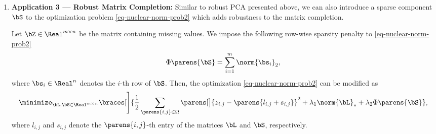 \documentclass[12pt]{article}
\begin{document}
\begin{enumerate}[label=\textbf{\arabic*.}]
\begin{enumerate}
	\end{enumerate}
		
	\item \textbf{Application 3 --- Robust Matrix Completion:} Similar to robust PCA presented above, we can also introduce a sparse component $\bS$ to the optimization problem \eqref{eq-nuclear-norm-prob2} which adds robustness to the matrix completion. 
	
	Let $\bZ \in \Real^{m \times n}$ be the matrix containing missing values. We impose the following row-wise sparsity penalty to \eqref{eq-nuclear-norm-prob2} 
	\begin{align*}
		\Phi \parens{\bS} = \sum_{i=1}^m \norm{\bs_i}_2, 
	\end{align*}
	where $\bs_i \in \Real^n$ denotes the $i$-th row of $\bS$. Then, the optimization \eqref{eq-nuclear-norm-prob2} can be modified as 
	\begin{align*}
		\minimize_{\bL, \bS \in \Real^{m \times n}} \braces[\Bigg]{\frac{1}{2} \sum_{\parens{i,j} \in \Omega} \parens[\big]{z_{i,j} - \parens{l_{i,j} + s_{i,j}}}^2 + \lambda_1 \norm{\bL}_* + \lambda_2 \Phi \parens{\bS}}, 
	\end{align*}
	where $l_{i,j}$ and $s_{i,j}$ denote the $\parens{i,j}$-th entry of the matrices $\bL$ and $\bS$, respectively. 	
	
\end{enumerate}

\printbibliography
\end{document}
